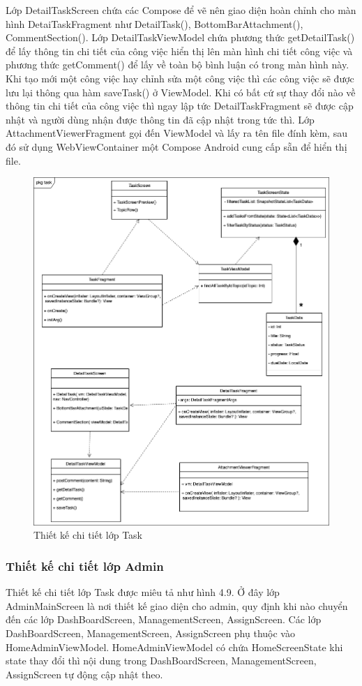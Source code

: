 \documentclass[../Main.tex]{subfiles}
\begin{document}
Lớp DetailTaskScreen chứa các Compose để vẽ nên giao diện hoàn chỉnh cho màn hình DetaiTaskFragment như DetailTask(), BottomBarAttachment(), CommentSection(). 
Lớp DetailTaskViewModel chứa phương thức getDetailTask() để lấy thông tin chi tiết của công việc hiển thị lên màn hình chi tiết công việc và phương thức getComment() để lấy về toàn bộ bình luận có trong màn hình này. Khi tạo mới một công việc hay chỉnh sửa một công việc thì các công việc sẽ được lưu lại thông qua hàm saveTask() ở ViewModel. Khi có bất cứ sự thay đổi nào về thông tin chi tiết của công việc thì ngay lập tức DetailTaskFragment sẽ được cập nhật và người dùng nhận được thông tin đã cập nhật trong tức thì. Lớp AttachmentViewerFragment gọi đến ViewModel và lấy ra tên file đính kèm, sau đó sử dụng WebViewContainer một Compose Android cung cấp sẵn để hiển thị file. 

\begin{figure}[H]
    \centering
    \includegraphics[width=0.95\linewidth]{Figure/chi_tiet_lop_task.png}
    \caption{Thiết kế chi tiết lớp Task}
    \label{fig:use_case_tổng_quan}
\end{figure}
\subsubsection{Thiết kế chi tiết lớp Admin} 
Thiết kế chi tiết lớp Task được miêu tả như hình 4.9. Ở đây lớp AdminMainScreen là nơi thiết kế giao diện cho admin, quy định khi nào chuyển đến các lớp DashBoardScreen, ManagementScreen, AssignScreen. Các lớp DashBoardScreen, ManagementScreen, AssignScreen phụ thuộc vào HomeAdminViewModel. HomeAdminViewModel có chứa HomeScreenState khi state thay đổi thì nội dung trong DashBoardScreen, ManagementScreen, AssignScreen tự động cập nhật theo.
\end{document}
